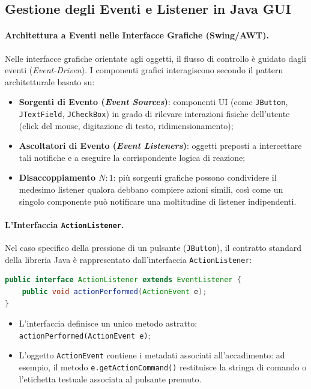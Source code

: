 \documentclass[12pt]{extarticle}
\begin{document}
\subsection{Gestione degli Eventi e Listener in Java GUI}

\paragraph{Architettura a Eventi nelle Interfacce Grafiche (Swing/AWT).}
Nelle interfacce grafiche orientate agli oggetti, il flusso di controllo è guidato dagli eventi (\textit{Event-Driven}). I componenti grafici interagiscono secondo il pattern architetturale basato su:
\begin{itemize}
    \item \textbf{Sorgenti di Evento (\textit{Event Sources})}: componenti UI (come \texttt{JButton}, \texttt{JTextField}, \texttt{JCheckBox}) in grado di rilevare interazioni fisiche dell'utente (click del mouse, digitazione di testo, ridimensionamento);
    \item \textbf{Ascoltatori di Evento (\textit{Event Listeners})}: oggetti preposti a intercettare tali notifiche e a eseguire la corrispondente logica di reazione;
    \item \textbf{Disaccoppiamento $N:1$}: più sorgenti grafiche possono condividere il medesimo listener qualora debbano compiere azioni simili, così come un singolo componente può notificare una moltitudine di listener indipendenti.
\end{itemize}

\paragraph{L'Interfaccia \texttt{ActionListener}.}
Nel caso specifico della pressione di un pulsante (\texttt{JButton}), il contratto standard della libreria Java è rappresentato dall'interfaccia \texttt{ActionListener}:
\begin{lstlisting}[language=Java]
public interface ActionListener extends EventListener {
    public void actionPerformed(ActionEvent e);
}
\end{lstlisting}
\begin{itemize}
    \item L'interfaccia definisce un unico metodo astratto: \texttt{actionPerformed(ActionEvent e)};
    \item L'oggetto \texttt{ActionEvent} contiene i metadati associati all'accadimento: ad esempio, il metodo \texttt{e.getActionCommand()} restituisce la stringa di comando o l'etichetta testuale associata al pulsante premuto.
\end{itemize}
\end{document}
